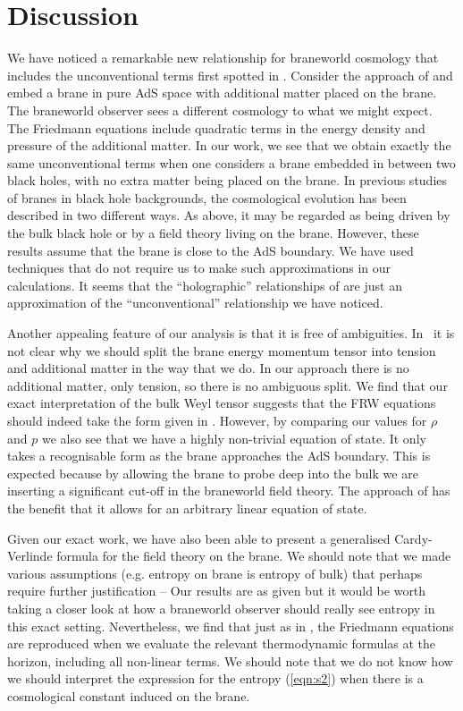 \documentclass[a4paper,12pt]{article}
\begin{document}
\section{Discussion}

We have noticed a remarkable new relationship for braneworld cosmology
that includes the unconventional terms first spotted in
\cite{Binetruy:branecos1,Binetruy:branecos2}. Consider the approach of
\cite{Binetruy:branecos1,Binetruy:branecos2} and embed a brane in pure
AdS space with additional matter placed on the brane. The braneworld
observer sees a different cosmology to what we might expect. The
Friedmann equations include quadratic terms in the energy density and
pressure of the additional matter. In our work, we see that we obtain
exactly the same unconventional terms when one considers a brane
embedded in between two black holes, with no extra matter being placed
on the brane. In previous studies of branes in black hole backgrounds,
the cosmological evolution has been described in two different
ways. As above, it may be regarded as being driven by the bulk black
hole or by a field theory living on the brane. However, these results
assume that the brane is close to the AdS boundary. We have used
techniques that do not require us to make such approximations in our
calculations. It seems that the ``holographic'' relationships of
\cite{Savonije:braneCFT} are just an approximation of the
``unconventional'' relationship we have noticed.

Another appealing feature of our analysis is that it is free of
ambiguities. In~\cite{Binetruy:branecos1,Binetruy:branecos2} it is not
clear why we should split the brane energy momentum tensor into
tension and additional matter in the way that we do. In our approach
there is no additional matter, only tension, so there is no ambiguous
split. We find that our exact interpretation of the bulk Weyl tensor
suggests that the FRW equations should indeed take the form given in
\cite{Binetruy:branecos1,Binetruy:branecos2}. However, by comparing
our values for $\rho$ and $p$ we also see that we have a highly
non-trivial equation of state. It only takes a recognisable form as
the brane approaches the AdS boundary. This is expected because by
allowing the brane to probe deep into the bulk we are inserting a
significant cut-off in the braneworld field theory. The approach of
\cite{Binetruy:branecos1,Binetruy:branecos2} has the benefit that it
allows for an arbitrary linear equation of state.

Given our exact work, we have also been able to present a generalised
Cardy-Verlinde formula for the field theory on the brane. We should
note that we made various assumptions (e.g. entropy on brane is
entropy of bulk) that perhaps require further justification -- Our
results are as given but it would be worth taking a closer look at how
a braneworld observer should really see entropy in this exact
setting. Nevertheless, we find that just as in
\cite{Savonije:braneCFT}, the Friedmann equations are reproduced when
we evaluate the relevant thermodynamic formulas at the horizon,
including all non-linear terms. We should note that we do not know how
we should interpret the expression for the entropy (\ref{eqn:s2}) when
there is a cosmological constant induced on the brane.
\end{document}
